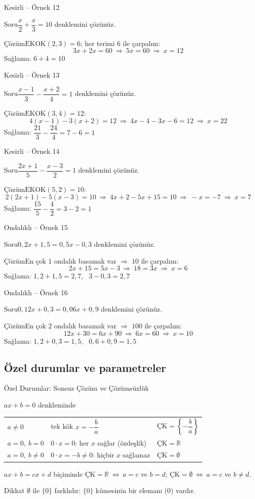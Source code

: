 \documentclass[aspectratio=169,11pt,handout]{beamer}
\newcommand{\soru}[3]{%
\begin{frame}{#1}
  \begin{block}{Soru}\large #2\end{block}
  \pause
  \begin{exampleblock}{Çözüm}\large #3\end{exampleblock}
\end{frame}}
\begin{document}
\soru{Kesirli -- Örnek 12}
{\(\dfrac{x}{2}+\dfrac{x}{3}=10\) denklemini çözünüz.}
{\(\text{EKOK}(2,3)=6\); her terimi \(6\) ile çarpalım:
\[3x+2x=60\ \Rightarrow\ 5x=60\ \Rightarrow\ x=12\]
Sağlama: \(6+4=10\) \checkmark}

\soru{Kesirli -- Örnek 13}
{\(\dfrac{x-1}{3}-\dfrac{x+2}{4}=1\) denklemini çözünüz.}
{\(\text{EKOK}(3,4)=12\):
\[4(x-1)-3(x+2)=12\ \Rightarrow\ 4x-4-3x-6=12\ \Rightarrow\ x=22\]
Sağlama: \(\dfrac{21}{3}-\dfrac{24}{4}=7-6=1\) \checkmark}

\soru{Kesirli -- Örnek 14}
{\(\dfrac{2x+1}{5}-\dfrac{x-3}{2}=1\) denklemini çözünüz.}
{\(\text{EKOK}(5,2)=10\):
\[2(2x+1)-5(x-3)=10\ \Rightarrow\ 4x+2-5x+15=10\ \Rightarrow\ -x=-7\ \Rightarrow\ x=7\]
Sağlama: \(\dfrac{15}{5}-\dfrac{4}{2}=3-2=1\) \checkmark}

\soru{Ondalıklı -- Örnek 15}
{\(0{,}2x+1{,}5=0{,}5x-0{,}3\) denklemini çözünüz.}
{En çok \(1\) ondalık basamak var \(\Rightarrow\) \(10\) ile çarpalım:
\[2x+15=5x-3\ \Rightarrow\ 18=3x\ \Rightarrow\ x=6\]
Sağlama: \(1{,}2+1{,}5=2{,}7\), \ \(3-0{,}3=2{,}7\) \checkmark}

\soru{Ondalıklı -- Örnek 16}
{\(0{,}12x+0{,}3=0{,}06x+0{,}9\) denklemini çözünüz.}
{En çok \(2\) ondalık basamak var \(\Rightarrow\) \(100\) ile çarpalım:
\[12x+30=6x+90\ \Rightarrow\ 6x=60\ \Rightarrow\ x=10\]
Sağlama: \(1{,}2+0{,}3=1{,}5\), \ \(0{,}6+0{,}9=1{,}5\) \checkmark}

\subsection{Özel durumlar ve parametreler}
\begin{frame}{Özel Durumlar: Sonsuz Çözüm ve Çözümsüzlük}
\begin{block}{\(ax+b=0\) denkleminde}
\begin{tabular}{@{}lll@{}}
\(a\neq 0\) & tek kök \(x=-\dfrac{b}{a}\) & \(\text{ÇK}=\left\{-\dfrac{b}{a}\right\}\)\\[8pt]
\(a=0,\ b=0\) & \(0\cdot x=0\): her \(x\) sağlar (özdeşlik) & \(\text{ÇK}=\mathbb{R}\)\\[4pt]
\(a=0,\ b\neq 0\) & \(0\cdot x=-b\neq 0\): hiçbir \(x\) sağlamaz & \(\text{ÇK}=\emptyset\)
\end{tabular}
\end{block}
\begin{block}{\(ax+b=cx+d\) biçiminde}
\(\text{ÇK}=\mathbb{R}\ \Leftrightarrow\ a=c\) ve \(b=d\); \qquad \(\text{ÇK}=\emptyset\ \Leftrightarrow\ a=c\) ve \(b\neq d\).
\end{block}
\begin{alertblock}{Dikkat}
\(\emptyset\) ile \(\{0\}\) farklıdır: \(\{0\}\) kümesinin bir elemanı (\(0\)) vardır.
\end{alertblock}
\end{frame}
\end{document}
